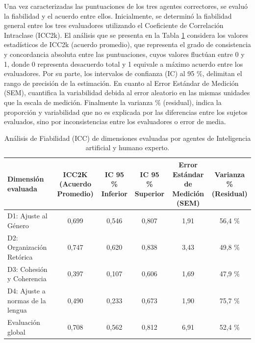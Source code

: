 \documentclass[spanish]{textolivre}
\begin{document}
Una vez caracterizadas las puntuaciones de los tres agentes correctores, se evaluó la fiabilidad y el acuerdo entre ellos. Inicialmente, se determinó la fiabilidad general entre los tres evaluadores utilizando el Coeficiente de Correlación Intraclase (ICC2k).  El análisis que se presenta en la Tabla \ref{tab-3} considera los valores estadísticos de ICC2k (acuerdo promedio), que representa el grado de consistencia y concordancia absoluta entre las puntuaciones, cuyos valores fluctúan entre 0 y 1, donde 0 representa desacuerdo total y 1 equivale a máximo acuerdo entre los evaluadores. Por su parte,  los intervalos de confianza (IC)  al 95 \%, delimitan el rango de precisión de la estimación. En cuanto al Error Estándar de Medición (SEM), cuantifica la variabilidad debida al error aleatorio en las mismas unidades que la escala de medición. Finalmente la varianza \% (residual), indica la proporción y variabilidad que no es explicada por las diferencias entre los sujetos evaluados, sino por inconsistencias entre los evaluadores o error de media.

\begin{table}[h!]
\centering
\footnotesize	
\begin{threeparttable}
\caption{Análisis de Fiabilidad (ICC) de dimensiones evaluadas por agentes de Inteligencia artificial y humano experto.}\label{tab-3}
\begin{tabular}{p{3.3cm}ccccc}
\toprule
Dimensión evaluada & \shortstack{ICC2K \\ (Acuerdo Promedio)} & \shortstack{IC 95 \\ \% Inferior} & \shortstack{IC 95 \\ \% Superior} & \shortstack{Error Estándar \\ de Medición (SEM)} & \shortstack{Varianza \% \\ (Residual)} \\
\midrule
D1: Ajuste al Género & 0,699 & 0,546 & 0,807 & 1,91 & 56,4 \% \\
D2: Organización Retórica & 0,747 & 0,620 & 0,838 & 3,43 & 49,8 \% \\
D3: Cohesión y Coherencia & 0,397 & 0,107 & 0,606 & 1,69 & 47,9 \% \\
D4: Ajuste a normas de la lengua & 0,490 & 0,233 & 0,673 & 1,90 & 75,7 \% \\
Evaluación global & 0,708 & 0,562 & 0,812 & 6,91 & 52,4 \% \\
\bottomrule
\end{tabular}
\end{threeparttable}
\end{table}
\end{document}
